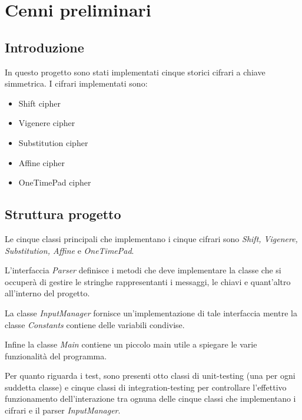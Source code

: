 \chapter{Cenni preliminari}

	\section{Introduzione}
		In questo progetto sono stati implementati cinque storici cifrari a chiave simmetrica. I cifrari implementati sono:
		\begin{itemize}
			\item Shift cipher
			\item Vigenere cipher
			\item Substitution cipher
			\item Affine cipher
			\item OneTimePad cipher
		\end{itemize}
		
	\section{Struttura progetto}
		Le cinque classi principali che implementano i cinque cifrari sono \emph{Shift, Vigenere, Substitution, Affine} e \emph{OneTimePad}.
		
		L'interfaccia \emph{Parser} definisce i metodi che deve implementare la classe che si occuperà di gestire le stringhe rappresentanti i messaggi, le chiavi e quant'altro all'interno del progetto.
		
		La classe \emph{InputManager} fornisce un'implementazione di tale interfaccia mentre la classe \emph{Constants} contiene delle variabili condivise.
		
		Infine la classe \emph{Main} contiene un piccolo main utile a spiegare le varie funzionalità del programma.
		
		Per quanto riguarda i test, sono presenti otto classi di unit-testing (una per ogni suddetta classe) e cinque classi di integration-testing per controllare l'effettivo funzionamento dell'interazione tra ognuna delle cinque classi che implementano i cifrari e il parser \emph{InputManager}.
